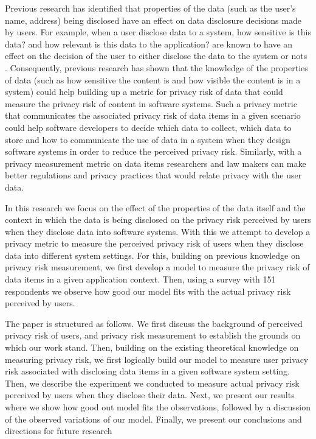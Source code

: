 \documentclass[10pt]{article}
\begin{document}
Previous research has identified that properties of the data (such as the user's name, address) being disclosed have an effect on data disclosure decisions made by users. For example, when a user disclose data to a system, how sensitive is this data? and how relevant is this data to the application? are known to have an effect on the decision of the user to either disclose the data to the system or nots \cite {malheiros2013fairly}. Consequently, previous research has shown that the knowledge of the properties of data (such as how sensitive the content is and how visible the content is in a system) could help building up a metric for privacy risk of data \cite {maximilien2009privacy} that could measure the privacy risk of content in software systems. Such a privacy metric that communicates the associated privacy risk of data items in a given scenario could help software developers to decide which data to collect, which data to store and how to communicate the use of data in a system when they design software systems in order to reduce the perceived privacy risk. Similarly, with a privacy measurement metric on data items researchers and law makers can make better regulations and privacy practices that would relate privacy with the user data.

In this research we focus on the effect of the properties of the data itself and the context in which the data is being disclosed on the privacy risk perceived by users when they disclose data into software systems. With this we  attempt to develop a privacy metric to measure the perceived privacy risk of users when they disclose data into different system settings. For this, building on previous knowledge on privacy risk measurement, we first develop a model to measure the privacy risk of data items in a given application context. Then, using a survey with 151 respondents we observe how good our model fits with the actual privacy risk perceived by users.

The paper is structured as follows. We first discuss the background of perceived privacy risk of users, and privacy risk measurement to establish the grounds on which our work stand. Then, building on the existing theoretical knowledge on measuring privacy risk, we first logically build our model to measure user privacy risk associated with disclosing data items in a given software system setting. Then, we describe the experiment we conducted to measure actual privacy risk perceived by users when they disclose their data. Next, we present our results where we show how good out model fits the observations, followed by a discussion of the observed variations of our model. Finally, we present our conclusions and directions for future research
\end{document}
